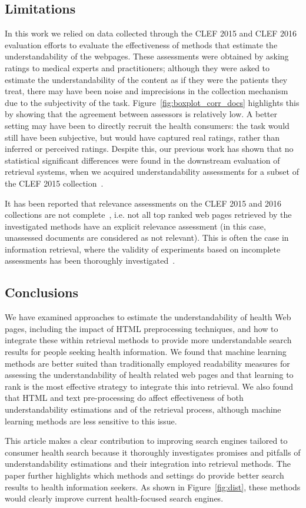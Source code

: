 \subsection*{Limitations}
In this work we relied on data collected through the CLEF 2015 and CLEF 2016 evaluation efforts to evaluate the effectiveness of methods that estimate the understandability of the webpages. These assessments were obtained by asking ratings to medical experts and practitioners; although they were asked to estimate the understandability of the content as if they were the patients they treat, there may have been noise and imprecisions in the collection mechanism due to the subjectivity of the task. Figure~\ref{fig:boxplot_corr_docs} highlights this by showing that the agreement between assessors is relatively low. A better setting may have been to directly recruit the health consumers: the task would still have been subjective, but would have captured real ratings, rather than inferred or perceived ratings. Despite this, our previous work has shown that no statistical significant differences were found in the downstream evaluation of retrieval systems, when we acquired understandability assessments for a subset of the CLEF 2015 collection~\cite{palotti16b}. 

It has been reported that relevance assessments on the CLEF 2015 and 2016 collections are not complete~\cite{clef15,clef16}, i.e. not all top ranked web pages retrieved by the investigated methods have an explicit relevance assessment (in this case, unassessed documents are considered as not relevant). This is often the case in information retrieval, where the validity of experiments based on incomplete assessments has been thoroughly investigated~\cite{sanderson2010test}. 

\subsection*{Conclusions}

We have examined approaches to estimate the understandability of health Web pages, including the impact of HTML preprocessing techniques, and how to integrate these within retrieval methods to provide more understandable search results for people seeking health information. We found that machine learning methods are better suited than traditionally employed readability measures for assessing the understandability of health related web pages and that learning to rank is the most effective strategy to integrate this into retrieval. We also found that HTML and text pre-processing do affect effectiveness of both understandability estimations and of the retrieval process, although machine learning methods are less sensitive to this issue.

This article makes a clear contribution to improving search engines tailored to consumer health search because it thoroughly investigates promises and pitfalls of understandability estimations and their integration into retrieval methods. The paper further highlights which methods and settings do provide better search results to health information seekers. As shown in Figure~\ref{fig:dist}, these methods would clearly improve current health-focused search engines. 